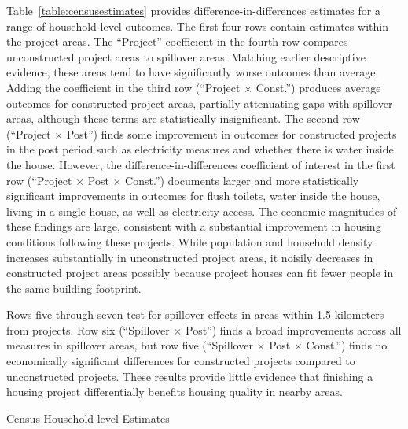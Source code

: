\documentclass[12pt]{article}
\begin{document}
Table~\ref{table:censusestimates} provides difference-in-differences estimates for a range of household-level outcomes.  The first four rows contain estimates within the project areas.  The ``Project'' coefficient in the fourth row compares unconstructed project areas to spillover areas.  Matching earlier descriptive evidence, these areas tend to have significantly worse outcomes than average.  Adding the coefficient in the third row (``Project $\times$ Const.'') produces average outcomes for constructed project areas, partially attenuating gaps with spillover areas, although these terms are statistically insignificant.  The second row (``Project $\times$ Post'') finds some improvement in outcomes for constructed projects in the post period such as electricity measures and whether there is water inside the house.  However, the difference-in-differences coefficient of interest in the first row (``Project $\times$ Post $\times$ Const.'') documents larger and more statistically significant improvements in outcomes for flush toilets, water inside the house, living in a single house, as well as electricity access.  The economic magnitudes of these findings are large, consistent with a substantial improvement in housing conditions following these projects.  While population and household density increases substantially in unconstructed project areas, it noisily decreases in constructed project areas possibly because project houses can fit fewer people in the same building footprint.

Rows five through seven test for spillover effects in areas within 1.5 kilometers from projects.  Row six (``Spillover $\times$ Post'') finds a broad improvements across all measures in spillover areas, but row five (``Spillover $\times$ Post $\times$ Const.'') finds no economically significant differences for constructed projects compared to unconstructed projects.  These results provide little evidence that finishing a housing project differentially benefits housing quality in nearby areas.

  \clearpage%
\begin{landscape}
{\footnotesize
\begin{table}
\caption{Census Household-level Estimates}\label{table:censusestimates}
\centering
\resizebox{!}{.3\textwidth}{ 

}
\end{table}
}
\end{landscape}
\end{document}
